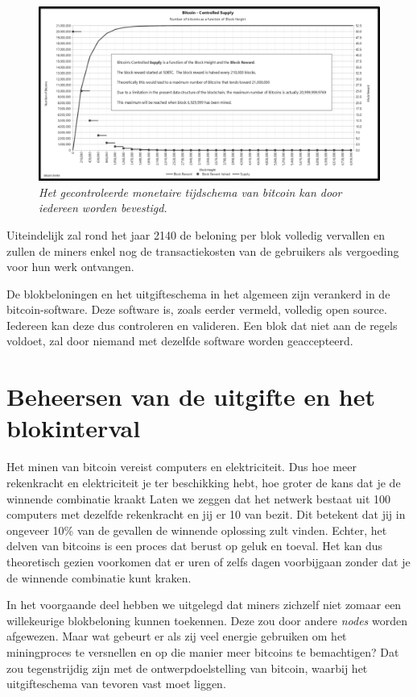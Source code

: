 \begin{figure}[h]
    \centering
    \includegraphics[width=\textwidth]{images/fig6.png}
    \caption{\footnotesize{\textit{Het gecontroleerde monetaire tijdschema van bitcoin kan door iedereen worden bevestigd.}}}
    \label{fig6}
\end{figure}

Uiteindelijk zal rond het jaar 2140 de beloning per blok volledig vervallen en zullen de miners enkel nog de transactiekosten van de gebruikers als vergoeding voor hun werk ontvangen.

De blokbeloningen en het uitgifteschema in het algemeen zijn verankerd in de bitcoin-software. Deze software is, zoals eerder vermeld, volledig open source. Iedereen kan deze dus controleren en valideren. Een blok dat niet aan de regels voldoet, zal door niemand met dezelfde software worden geaccepteerd.

\section{Beheersen van de uitgifte en het blokinterval}

Het minen van bitcoin vereist computers en elektriciteit. Dus hoe meer rekenkracht en elektriciteit je ter beschikking hebt, hoe groter de kans dat je de winnende combinatie kraakt Laten we zeggen dat het netwerk bestaat uit 100 computers met dezelfde rekenkracht en jij er 10 van bezit. Dit betekent dat jij in ongeveer 10\% van de gevallen de winnende oplossing zult vinden. Echter, het delven van bitcoins is een proces dat berust op geluk en toeval. Het kan dus theoretisch gezien voorkomen dat er uren of zelfs dagen voorbijgaan zonder dat je de winnende combinatie kunt kraken.

In het voorgaande deel hebben we uitgelegd dat miners zichzelf niet zomaar een willekeurige blokbeloning kunnen toekennen. Deze zou door andere \textit{nodes} worden afgewezen. Maar wat gebeurt er als zij veel energie gebruiken om het miningproces te versnellen en op die manier meer bitcoins te bemachtigen? Dat zou tegenstrijdig zijn met de ontwerpdoelstelling van bitcoin, waarbij het uitgifteschema van tevoren vast moet liggen.

